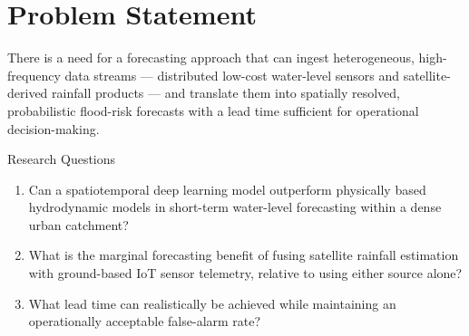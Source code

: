 \section{Problem Statement}
There is a need for a forecasting approach that can ingest heterogeneous, high-frequency data streams --- distributed low-cost water-level sensors and satellite-derived rainfall products --- and translate them into spatially resolved, probabilistic flood-risk forecasts with a lead time sufficient for operational decision-making.

\begin{chulabox}{Research Questions}
\begin{enumerate}[label=\textbf{RQ\arabic*.}, leftmargin=2.2em]
  \item Can a spatiotemporal deep learning model outperform physically based hydrodynamic models in short-term water-level forecasting within a dense urban catchment?
  \item What is the marginal forecasting benefit of fusing satellite rainfall estimation with ground-based IoT sensor telemetry, relative to using either source alone?
  \item What lead time can realistically be achieved while maintaining an operationally acceptable false-alarm rate?
\end{enumerate}
\end{chulabox}
